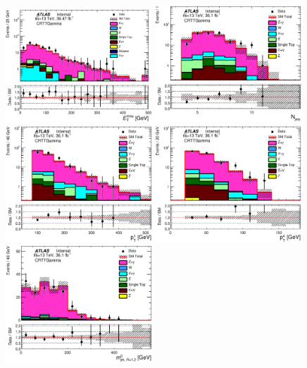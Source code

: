 \begin{figure}[htbp]
\begin{center}
\includegraphics[width=0.49\textwidth]{figures/ttGamma/Met_CRTTGamma_withRatio_log.eps}
\includegraphics[width=0.49\textwidth]{figures/ttGamma/postfit/NJets_CRTTGamma_log.eps}
\includegraphics[width=0.49\textwidth]{figures/ttGamma/postfit/JetPt_1__CRTTGamma_log.eps}
\includegraphics[width=0.49\textwidth]{figures/ttGamma/postfit/JetPt_4__CRTTGamma_log.eps}
\includegraphics[width=0.49\textwidth]{figures/ttGamma/postfit/AntiKt12M_0__CRTTGamma.eps}

\end{center}
\end{figure}
